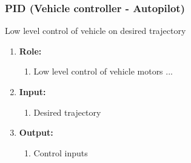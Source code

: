 \subsubsection{PID (Vehicle controller - Autopilot)}
	Low level control of vehicle on desired trajectory
	\begin{enumerate}[]
	\item \textbf{Role:}
		\begin{enumerate}[]
		\item Low level control of vehicle motors ...
		\end{enumerate}
	\item \textbf{Input:}
		\begin{enumerate}[1.]
		\item Desired trajectory
		\end{enumerate}
	\item \textbf{Output:}
		\begin{enumerate}[2.]
		\item Control inputs 
		\end{enumerate}
	\end{enumerate}
